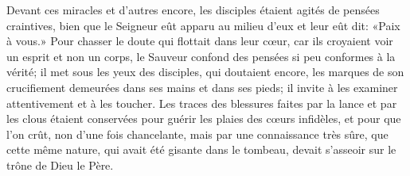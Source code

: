Devant ces miracles et d’autres encore,
	les disciples étaient agités de pensées craintives,
	bien que le Seigneur eût apparu au milieu d’eux et leur eût dit:
	«Paix à vous.»
Pour chasser le doute qui flottait dans leur cœur,
	car ils croyaient voir un esprit et non un corps,
	le Sauveur confond des pensées si peu conformes à la vérité;
	il met sous les yeux des disciples, qui doutaient encore,
	les marques de son crucifiement demeurées dans ses mains et dans ses pieds;
	il invite à les examiner attentivement et à les toucher.
Les traces des blessures faites par la lance et par les clous
	étaient conservées pour guérir les plaies des cœurs infidèles,
	et pour que l’on crût, non d’une fois chancelante,
	mais par une connaissance très sûre,
	que cette même nature, qui avait été gisante dans le tombeau,
	devait s’asseoir sur le trône de Dieu le Père.
